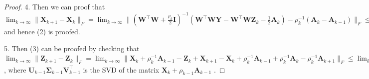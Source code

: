 \documentclass[10pt,twocolumn,letterpaper,sort&compress]{article}
\begin{document}
\begin{proof}
4. Then we can proof that 
$
\lim_{k \to \infty} 
\|
\mathbf{X}_{k+1}
-
\mathbf{X}_{k}
\|_{F}
=
\lim_{k \to \infty} 
\|
(\mathbf{W}^{\top}\mathbf{W}
+
\frac{\rho_{k}}{2}
\mathbf{I})^{-1}
(\mathbf{W}^{\top}\mathbf{W}\mathbf{Y}
-
\mathbf{W}^{\top}\mathbf{W}\mathbf{Z}_{k}
-
\frac{1}{2}
\mathbf{A}_{k})
-
\rho_{k}^{-1}
(\mathbf{A}_{k}-\mathbf{A}_{k-1})
\|_{F}
\le
\lim_{k \to \infty} 
\|
(\mathbf{W}^{\top}\mathbf{W}
+
\frac{\rho_{k}}{2}
\mathbf{I})^{-1}
(\mathbf{W}^{\top}\mathbf{W}\mathbf{Y}
-
\mathbf{W}^{\top}\mathbf{W}\mathbf{Z}_{k}
-
\frac{1}{2}
\mathbf{A}_{k})
\|_{F}
+
\rho_{k}^{-1}\|
\mathbf{A}_{k}-\mathbf{A}_{k-1}
\|_{F}
=
0
$
and hence (2) is proofed. 

5. Then (3) can be proofed by checking that 
$
\lim_{k \to \infty} 
\|
\mathbf{Z}_{k+1}-\mathbf{Z}_{k}
\|_{F}
=
\lim_{k \to \infty} 
\|
\mathbf{X}_{k}+\rho_{k}^{-1}\mathbf{A}_{k-1}-\mathbf{Z}_{k}
+
\mathbf{X}_{k+1}-\mathbf{X}_{k}
+
\rho_{k}^{-1}
\mathbf{A}_{k-1}
+
\rho_{k}^{-1}
\mathbf{A}_{k}
-
\rho_{k}^{-1}
\mathbf{A}_{k+1}
\|_{F}
\le
\lim_{k \to \infty} 
\|
\mathbf{\Sigma}_{k-1}-\mathcal{S}_{\bm{w}/\rho_{k-1}}(\mathbf{\Sigma}_{k-1})
\|_{F}
+
\|
\mathbf{X}_{k+1}-\mathbf{X}_{k}
\|_{F}
+
\rho_{k}^{-1}
\|
\mathbf{A}_{k-1}
+
\mathbf{A}_{k+1}
-
\mathbf{A}_{k}
\|_{F}
=
0
$
,
where $\mathbf{U}_{k-1}\mathbf{\Sigma}_{k-1}\mathbf{V}_{k-1}^{\top}$ is the SVD of the matrix $\mathbf{X}_{k}+\rho_{k-1}\mathbf{A}_{k-1}$
.
\end{proof}


{
\small


}
\end{document}
